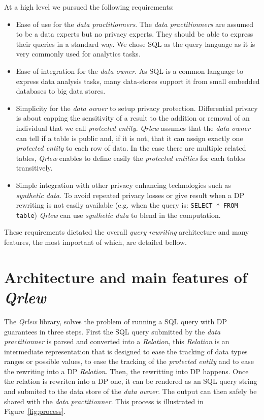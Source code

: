 \documentclass[letterpaper]{article} %
\newcommand{\qrlew}{\emph{Qrlew}}
\begin{document}
At a high level we pursued the following requirements:
\begin{itemize}
    \item Ease of use for the \emph{data practitionners}. The \emph{data practitionners} are assumed to be a data experts but no privacy experts. They should be able to express their queries in a standard way. We chose SQL as the query language as it is very commonly used for analytics tasks.
    \item Ease of integration for the \emph{data owner}. As SQL is a common language to express data analysis tasks, many data-stores support it from small embedded databases to big data stores.
    \item Simplicity for the \emph{data owner} to setup privacy protection. Differential privacy is about capping the sensitivity of a result to the addition or removal of an individual that we call \emph{protected entity}. \qrlew{} assumes that the \emph{data owner} can tell if a table is public and, if it is not, that it can assign exactly one \emph{protected entity} to each row of data. In the case there are multiple related tables, \qrlew{} enables to define easily the \emph{protected entities} for each tables transitively.
    \item Simple integration with other privacy enhancing technologies such as \emph{synthetic data}. To avoid repeated privacy losses or give result when a DP rewriting is not easily available (e.g. when the query is: \texttt{SELECT * FROM table}) \qrlew{} can use \emph{synthetic data} to blend in the computation.
\end{itemize}

These requirements dictated the overall \emph{query rewriting} architecture and many features, the most important of which, are detailed bellow.

\section{Architecture and main features of \qrlew}

The \qrlew{} library, solves the problem of running a SQL query with DP guarantees in three steps. First the SQL query submitted by the \emph{data practitionner} is parsed and converted into a \emph{Relation}, this \emph{Relation} is an intermediate representation that is designed to ease the tracking of data types ranges or possible values, to ease the tracking of the \emph{protected entity} and to ease the rewriting into a DP \emph{Relation}. Then, the rewritting into DP happens. Once the relation is rewriten into a DP one, it can be rendered as an SQL query string and submited to the data store of the \emph{data owner}. The output can then safely be shared with the \emph{data practitionner}. This process is illustrated in Figure~\ref{fig:process}.
\end{document}
